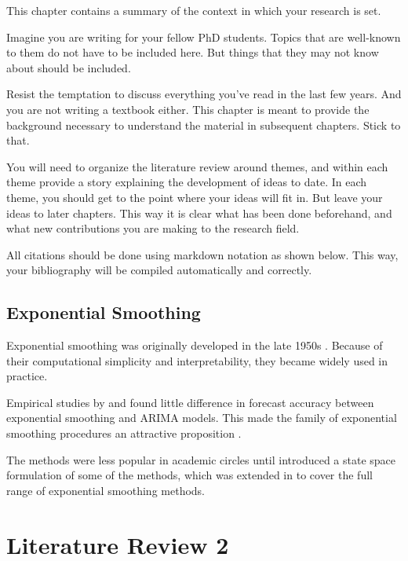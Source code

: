 \documentclass{umagthesis}
\begin{document}
This chapter contains a summary of the context in which your research is set.

Imagine you are writing for your fellow PhD students. Topics that are well-known to them do not have to be included here. But things that they may not know about should be included.

Resist the temptation to discuss everything you've read in the last few years. And you are not writing a textbook either. This chapter is meant to provide the background necessary to understand the material in subsequent chapters. Stick to that.

You will need to organize the literature review around themes, and within each theme provide a story explaining the development of ideas to date. In each theme, you should get to the point where your ideas will fit in. But leave your ideas to later chapters. This way it is clear what has been done beforehand, and what new contributions you are making to the research field.

All citations should be done using markdown notation as shown below. This way, your bibliography will be compiled automatically and correctly.

\hypertarget{sec:expsmooth}{%
\section{Exponential Smoothing}\label{sec:expsmooth}}

Exponential smoothing was originally developed in the late 1950s \autocite{Brown59,Brown63,Holt57,Winters60}. Because of their computational simplicity and interpretability, they became widely used in practice.

Empirical studies by \textcite{MH79} and \textcite{Metal82} found little difference in forecast accuracy between exponential smoothing and ARIMA models. This made the family of exponential smoothing procedures an attractive proposition \autocite[see][]{CKOS01}.

The methods were less popular in academic circles until \textcite{OKS97} introduced a state space formulation of some of the methods, which was extended in \textcite{HKSG02} to cover the full range of exponential smoothing methods.

\hypertarget{ch:litreview2}{%
\chapter{Literature Review 2}\label{ch:litreview2}}
\end{document}
